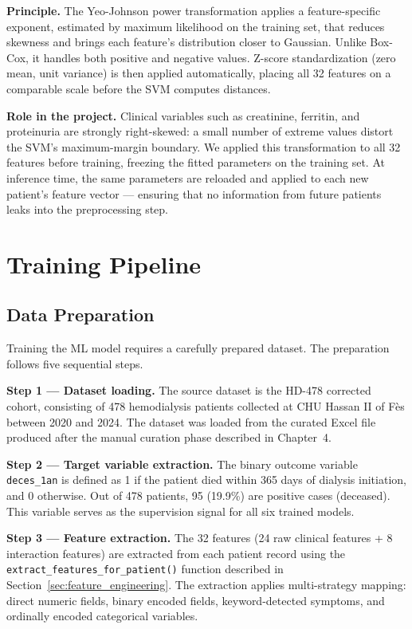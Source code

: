 \documentclass[12pt,a4paper,twoside]{report}
\begin{document}
\textbf{Principle.} The Yeo-Johnson power transformation \cite{yeo_johnson_2000} applies a feature-specific exponent, estimated by maximum likelihood on the training set, that reduces skewness and brings each feature's distribution closer to Gaussian. Unlike Box-Cox, it handles both positive and negative values. Z-score standardization (zero mean, unit variance) is then applied automatically, placing all 32 features on a comparable scale before the SVM computes distances.

\textbf{Role in the project.} Clinical variables such as creatinine, ferritin, and proteinuria are strongly right-skewed: a small number of extreme values distort the SVM's maximum-margin boundary. We applied this transformation to all 32 features before training, freezing the fitted parameters on the training set. At inference time, the same parameters are reloaded and applied to each new patient's feature vector — ensuring that no information from future patients leaks into the preprocessing step.

\section{Training Pipeline}\label{sec:training}

\subsection{Data Preparation}

Training the ML model requires a carefully prepared dataset. The preparation follows five sequential steps.

\textbf{Step 1 — Dataset loading.}
The source dataset is the HD-478 corrected cohort, consisting of 478 hemodialysis patients collected at CHU Hassan II of Fès between 2020 and 2024. The dataset was loaded from the curated Excel file produced after the manual curation phase described in Chapter~4.

\textbf{Step 2 — Target variable extraction.}
The binary outcome variable \texttt{deces\_1an} is defined as 1 if the patient died within 365 days of dialysis initiation, and 0 otherwise. Out of 478 patients, 95 (19.9\%) are positive cases (deceased). This variable serves as the supervision signal for all six trained models.

\textbf{Step 3 — Feature extraction.}
The 32 features (24 raw clinical features + 8 interaction features) are extracted from each patient record using the \texttt{extract\_features\allowbreak\_for\_patient()} function described in Section~\ref{sec:feature_engineering}. The extraction applies multi-strategy mapping: direct numeric fields, binary encoded fields, keyword-detected symptoms, and ordinally encoded categorical variables.
\end{document}
